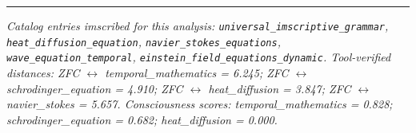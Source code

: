 \documentclass[12pt,a4paper]{article}
\begin{document}
\begin{center}
\rule{0.5\textwidth}{0.4pt}
\end{center}

\emph{Catalog entries imscribed for this analysis: \texttt{universal\_imscriptive\_grammar}, \texttt{heat\_diffusion\_equation}, \texttt{navier\_stokes\_equations}, \texttt{wave\_equation\_temporal}, \texttt{einstein\_field\_equations\_dynamic}. Tool-verified distances: ZFC $\leftrightarrow$ temporal\_mathematics = 6.245; ZFC $\leftrightarrow$ schrodinger\_equation = 4.910; ZFC $\leftrightarrow$ heat\_diffusion = 3.847; ZFC $\leftrightarrow$ navier\_stokes = 5.657. Consciousness scores: temporal\_mathematics = 0.828; schrodinger\_equation = 0.682; heat\_diffusion = 0.000.}
\end{document}
